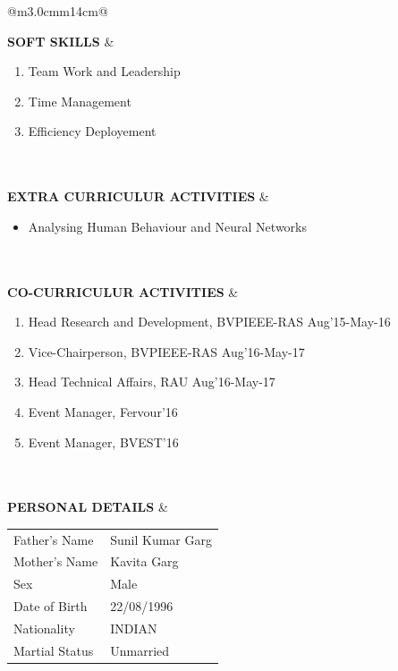 \documentclass[a4paper]{article}
\begin{document}
\begin{longtable}{@{}m{3.0cm}m{14cm}@{}}
			
			\textrm{\textbf {SOFT SKILLS}} & 
				\begin{enumerate}
					\itemsep -2pt
					\item
					Team Work and Leadership
					\item
					Time Management
					\item
					Efficiency Deployement
				\end{enumerate}
			\\ \\
			
			
			\textrm{\textbf {EXTRA \newline CURRICULUR ACTIVITIES}} & 
				\begin{itemize}
					\itemsep -2pt
					\item
					Analysing Human Behaviour and Neural Networks
				\end{itemize}
			\\ \\
			
			
			\textrm{\textbf {CO-CURRICULUR ACTIVITIES}} & 
				\begin{enumerate}
					\itemsep -2pt
					\item
					Head Research and Development, BVPIEEE-RAS \hfill Aug'15-May-16
					\item
					Vice-Chairperson, BVPIEEE-RAS \hfill Aug'16-May-17
					\item
					Head Technical Affairs, RAU \hfill Aug'16-May-17
					\item
					Event Manager, Fervour'16
					\item
					Event Manager, BVEST'16
				\end{enumerate}
			\\ \\
			
			\textrm{\textbf {PERSONAL DETAILS}} & 
				\begin{center}
					\begin{tabular}{ m{4cm}m{4cm}}
						Father's Name & Sunil Kumar Garg \\
						Mother's Name & Kavita Garg \\
						Sex & Male \\
						Date of Birth & 22/08/1996 \\
						Nationality & INDIAN \\
						Martial Status & Unmarried \\
  					\end{tabular}
				\end{center}
			\\ \\
			

\end{longtable}
\end{document}
